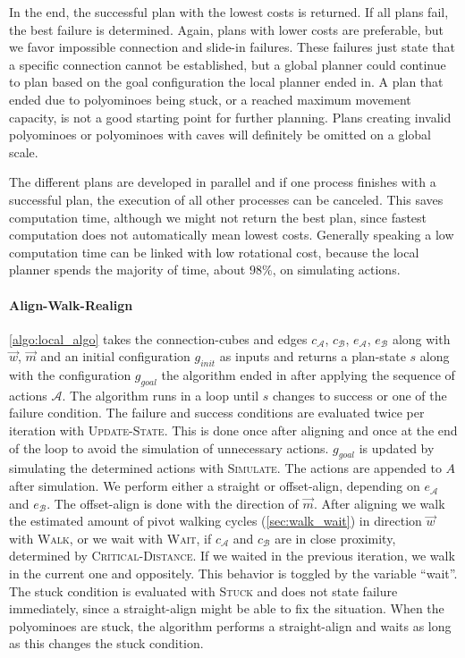 In the end, the successful plan with the lowest costs is returned.
If all plans fail, the best failure is determined.
Again, plans with lower costs are preferable, but we favor impossible connection and slide-in failures.
These failures just state that a specific connection cannot be established, but a global planner could continue to plan based on the goal configuration the local planner ended in.
A plan that ended due to polyominoes being stuck, or a reached maximum movement capacity, is not a good starting point for further planning.
Plans creating invalid polyominoes or polyominoes with caves will definitely be omitted on a global scale.

The different plans are developed in parallel and if one process finishes with a successful plan, the execution of all other processes can be canceled.
This saves computation time, although we might not return the best plan, since fastest computation does not automatically mean lowest costs.
Generally speaking a low computation time can be linked with low rotational cost, because the local planner spends the majority of time, about $98\%$, on simulating actions.

\paragraph{Align-Walk-Realign}

\autoref{algo:local_algo} takes the connection-cubes and edges $c_\mathcal{A}$, $c_\mathcal{B}$, $e_\mathcal{A}$, $e_\mathcal{B}$ along with $\vec{w}$, $\vec{m}$ and an initial configuration $g_\textit{init}$ as inputs and returns a plan-state $s$ along with the configuration $g_\textit{goal}$ the algorithm ended in after applying the sequence of actions $\mathcal{A}$.
The algorithm runs in a loop until $s$ changes to success or one of the failure condition.
The failure and success conditions are evaluated twice per iteration with {\scshape Update-State}.
This is done once after aligning and once at the end of the loop to avoid the simulation of unnecessary actions.
$g_\textit{goal}$ is updated by simulating the determined actions with {\scshape Simulate}.
The actions are appended to $A$ after simulation.
We perform either a straight or offset-align, depending on $e_\mathcal{A}$ and $e_\mathcal{B}$.
The offset-align is done with the direction of $\vec{m}$.
After aligning we walk the estimated amount of pivot walking cycles (\autoref{sec:walk_wait}) in direction $\vec{w}$ with {\scshape Walk}, or we wait with {\scshape Wait}, if $c_\mathcal{A}$ and $c_\mathcal{B}$ are in close proximity, determined by {\scshape Critical-Distance}.
If we waited in the previous iteration, we walk in the current one and oppositely.
This behavior is toggled by the variable ``wait''. 
The stuck condition is evaluated with {\scshape Stuck} and does not state failure immediately, since a straight-align might be able to fix the situation.
When the polyominoes are stuck, the algorithm performs a straight-align and waits as long as this changes the stuck condition.

